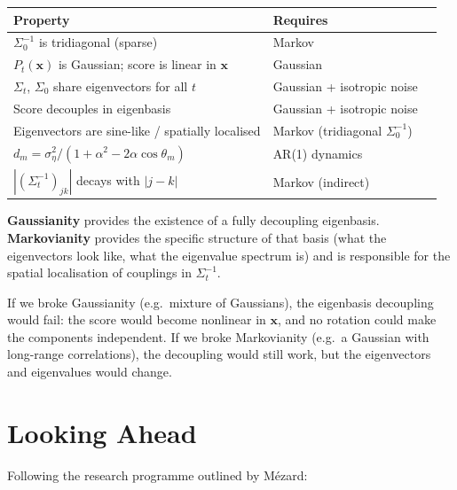 \documentclass[11pt,a4paper]{article}
\theoremstyle{definition}
\newcommand{\se}{\sigma_\eta^2}
\begin{document}
\begin{center}
\renewcommand{\arraystretch}{1.25}
\begin{tabular}{@{}p{7.5cm}ll@{}}
\toprule
\textbf{Property} & \textbf{Requires} \\
\midrule
$\Sigma_0^{-1}$ is tridiagonal (sparse) & Markov \\
$P_t(\mathbf{x})$ is Gaussian; score is linear in $\mathbf{x}$ & Gaussian \\
$\Sigma_t$, $\Sigma_0$ share eigenvectors for all $t$ & Gaussian + isotropic noise\\
Score decouples in eigenbasis & Gaussian + isotropic noise\\
Eigenvectors are sine-like / spatially localised & Markov (tridiagonal $\Sigma_0^{-1}$) \\
$d_m = \se/(1+\alpha^2-2\alpha\cos\theta_m)$ & AR(1) dynamics \\
$|(\Sigma_t^{-1})_{jk}|$ decays with $|j-k|$ & Markov (indirect) \\
\bottomrule
\end{tabular}
\end{center}

\medskip

\textbf{Gaussianity} provides the existence of a fully decoupling eigenbasis.
\textbf{Markovianity} provides the specific structure of that basis (what the eigenvectors look like, what the eigenvalue spectrum is) and is responsible for the spatial localisation of couplings in $\Sigma_t^{-1}$.

If we broke Gaussianity (e.g.\ mixture of Gaussians), the eigenbasis decoupling would fail: the score would become nonlinear in $\mathbf{x}$, and no rotation could make the components independent.
If we broke Markovianity (e.g.\ a Gaussian with long-range correlations), the decoupling would still work, but the eigenvectors and eigenvalues would change.


\section{Looking Ahead}
\label{sec:ahead}

Following the research programme outlined by M\'ezard:
\end{document}

